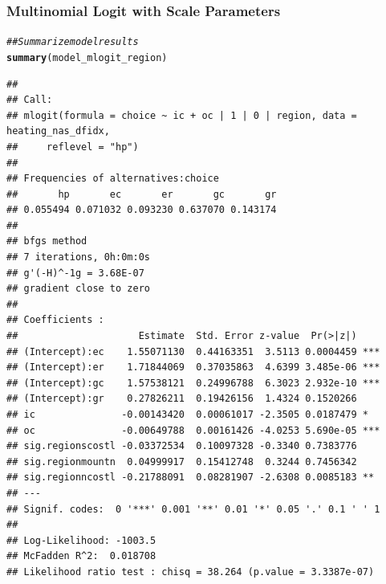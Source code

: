 \documentclass{beamer}\usepackage[]{graphicx}\usepackage[]{xcolor}
\makeatletter
\newcommand{\hlcom}[1]{\textcolor[rgb]{0.678,0.584,0.686}{\textit{#1}}}%
\newcommand{\hlstd}[1]{\textcolor[rgb]{0.345,0.345,0.345}{#1}}%
\newcommand{\hlkwd}[1]{\textcolor[rgb]{0.737,0.353,0.396}{\textbf{#1}}}%
\newenvironment{kframe}{%
 \def\at@end@of@kframe{}%
 \ifinner\ifhmode%
  \def\at@end@of@kframe{\end{minipage}}%
  \begin{minipage}{\columnwidth}%
 \fi\fi%
 \def\FrameCommand##1{\hskip\@totalleftmargin \hskip-\fboxsep
 \colorbox{shadecolor}{##1}\hskip-\fboxsep
     \hskip-\linewidth \hskip-\@totalleftmargin \hskip\columnwidth}%
 \MakeFramed {\advance\hsize-\width
   \@totalleftmargin\z@ \linewidth\hsize
   \@setminipage}}%
 {\par\unskip\endMakeFramed%
 \at@end@of@kframe}
\newenvironment{knitrout}{}{} %
\makeatother
\begin{document}
\begin{frame}[fragile]\frametitle{Multinomial Logit with Scale Parameters}
    \vspace{0.5ex}
\begin{knitrout}\tiny
{}\color{fgcolor}\begin{kframe}
\begin{alltt}
\hlcom{## Summarize model results}
\hlkwd{summary}\hlstd{(model_mlogit_region)}
\end{alltt}
\begin{verbatim}
## 
## Call:
## mlogit(formula = choice ~ ic + oc | 1 | 0 | region, data = heating_nas_dfidx, 
##     reflevel = "hp")
## 
## Frequencies of alternatives:choice
##       hp       ec       er       gc       gr 
## 0.055494 0.071032 0.093230 0.637070 0.143174 
## 
## bfgs method
## 7 iterations, 0h:0m:0s 
## g'(-H)^-1g = 3.68E-07 
## gradient close to zero 
## 
## Coefficients :
##                     Estimate  Std. Error z-value  Pr(>|z|)    
## (Intercept):ec    1.55071130  0.44163351  3.5113 0.0004459 ***
## (Intercept):er    1.71844069  0.37035863  4.6399 3.485e-06 ***
## (Intercept):gc    1.57538121  0.24996788  6.3023 2.932e-10 ***
## (Intercept):gr    0.27826211  0.19426156  1.4324 0.1520266    
## ic               -0.00143420  0.00061017 -2.3505 0.0187479 *  
## oc               -0.00649788  0.00161426 -4.0253 5.690e-05 ***
## sig.regionscostl -0.03372534  0.10097328 -0.3340 0.7383776    
## sig.regionmountn  0.04999917  0.15412748  0.3244 0.7456342    
## sig.regionncostl -0.21788091  0.08281907 -2.6308 0.0085183 ** 
## ---
## Signif. codes:  0 '***' 0.001 '**' 0.01 '*' 0.05 '.' 0.1 ' ' 1
## 
## Log-Likelihood: -1003.5
## McFadden R^2:  0.018708 
## Likelihood ratio test : chisq = 38.264 (p.value = 3.3387e-07)
\end{verbatim}
\end{kframe}
\end{knitrout}
\end{frame}
\end{document}
